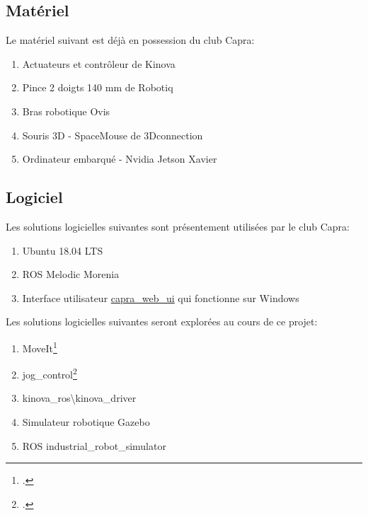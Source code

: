 \subsection{Matériel}
Le matériel suivant est déjà en possession du club Capra:
\begin{enumerate}[nosep]
    \item Actuateurs et contrôleur de Kinova
    \item Pince 2 doigts 140 mm de Robotiq
    \item Bras robotique Ovis
    \item Souris 3D - SpaceMouse de 3Dconnection
    \item Ordinateur embarqué - Nvidia Jetson Xavier%
\end{enumerate}

\subsection{Logiciel}
Les solutions logicielles suivantes sont présentement utilisées par le club Capra:
\begin{enumerate}[nosep]
    \item Ubuntu 18.04 LTS
    \item ROS Melodic Morenia%
    \item Interface utilisateur \href{https://github.com/clubcapra/capra_web_ui}{capra\_web\_ui} qui fonctionne sur Windows
\end{enumerate}
Les solutions logicielles suivantes seront explorées au cours de ce projet:
\begin{enumerate}[nosep]
    \item MoveIt\footcite{ioan_a_sucan_moveit_nodate}
    \item jog\_control\footcite{ryosuke_tajima_jog_control_nodate}
    \item kinova\_ros\textbackslash kinova\_driver
    \item Simulateur robotique Gazebo
    \item ROS industrial\_robot\_simulator
\end{enumerate}